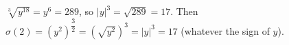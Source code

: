 $\sqrt[3]{y^{18}}=y^6=289$, so $|y|^3=\sqrt{289}=17$. Then $\sigma(2)=\left(y^2\right)^{\dfrac32}=\left(\sqrt{y^2}\right)^3=|y|^3=\boxed{17}$ (whatever the sign of $y$).
